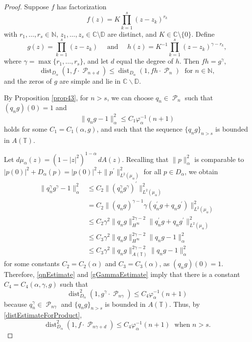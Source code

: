 \documentclass[11 pt,reqno]{amsart}
\theoremstyle{definition}
\theoremstyle{remark}
\numberwithin{equation}{section} \numberwithin{figure}{section}
\newcommand{\CC}{{\mathbb C}}
\newcommand{\DD}{{\mathbb D}}
\newcommand{\TT}{{\mathbb T}}
\newcommand{\NN}{{\mathbb N}}
\DeclareMathOperator{\Pol}{{\mathcal P}}
\DeclareMathOperator{\dist}{dist}
\begin{document}
\begin{proof}
Suppose $f$ has factorization
\[  f(z)=K \prod_{k=1}^s (z-z_k)^{r_k}  \]
with $r_{1},\ldots,r_{s}\in\NN$, $z_1,\ldots,z_{s}\in\CC\setminus\DD$ are distinct,
and $K \in\CC\setminus\{0\}$.  Define
\[g(z)=\prod_{k=1}^{s}(z-z_k)\quad\text{ and }\quad
    h(z) =K^{-1}\prod_{k=1}^s (z-z_k)^{\gamma- r_k},\]
where $\gamma=\max\{r_1,\ldots,r_s\}$, and let $d$ equal the degree of $h$.
Then $fh=g^{\gamma}$,
\begin{equation}\label{distEstimateForProduct}
            \dist_{D_{\alpha}}(1,f\cdot\Pol_{n+d})
            \leq\dist_{D_{\alpha}}(1,fh\cdot\Pol_{n})\;\text{ for }n\in\NN,
\end{equation}
and the zeros of $g$ are simple and lie in $\CC\backslash\DD$.

By Proposition \ref{prop43}, for $n>s$, we can choose $q_{n}\in\Pol_{n}$ such
that $(q_{n}g)(0)=1$ and
\begin{equation}\label{qnEstimate}
            \|q_{n}g-1\|^2_\alpha\leq C_{1}\varphi_{\alpha}^{-1}(n+1)
\end{equation}
holds for some $C_{1}=C_{1}(\alpha,g)$,  and such that the sequence
$\{q_{n} g\}_{n>s}$ is bounded in $A(\TT)$.

Let $d\mu_{\alpha}(z)=(1-|z|^{2})^{1-\alpha}\, dA(z)$.  Recalling that
$\|p\|_{\alpha}^2$ is comparable to
$|p(0)|^{2}+D_{\alpha}(p)=|p(0)|^{2}+\|p^{\prime}\|_{L^{2}(\mu_{\alpha})}^{2}$
for all $p\in D_{\alpha}$, we obtain
\begin{align}
            \|q_{n}^{\gamma}g^{\gamma} -1\|^2_\alpha
            &\leq C_{2}\|(q_{n}^{\gamma}g^{\gamma})^{\prime}\|^2_{L^{2}(\mu_{\alpha})}\nonumber\\
            &= C_{2}\|(q_n g)^{\gamma-1}\gamma (q_n^{\prime}g
            +q_n g^{\prime})\|^2_{L^{2}(\mu_{\alpha})}\nonumber\\
            &\leq C_{2}\gamma^{2}\|q_n g\|_{H^{\infty}}^{2\gamma-2}
            \|q_n^{\prime}g+q_n g^{\prime}\|^2_{L^{2}(\mu_{\alpha})}\nonumber\\
            &\leq C_{3}\gamma^{2}\|q_n g\|_{H^{\infty}}^{2\gamma-2}
            \|q_{n}g-1\|^{2}_{\alpha}\nonumber\\
            &\leq C_{3}\gamma^{2}\|q_n g\|_{A(\TT)}^{2\gamma-2}
            \|q_{n}g-1\|^{2}_{\alpha}\label{gGammaEstimate}
\end{align}
for some constants $C_{2}=C_{2}(\alpha)$ and $C_{3}=C_{3}(\alpha)$, as
$(q_{n}g)(0)=1$.  Therefore, \eqref{qnEstimate} and \eqref{gGammaEstimate}
imply that there is a constant $C_{4}=C_{4}(\alpha,\gamma, g)$ such that
\[  \dist_{D_{\alpha}}^{2}(1,g^{\gamma}\cdot\Pol_{n\gamma})
        \leq C_{4}\varphi_{\alpha}^{-1}(n+1)    \]
because $q_{n}^{\gamma}\in\Pol_{n\gamma}$ and $\{q_{n} g\}_{n>s}$ is bounded
in $A(\TT)$.  Thus, by \eqref{distEstimateForProduct},
\begin{equation}\label{distLinear}
            \dist_{D_{\alpha}}^{2}(1,f\cdot\Pol_{n\gamma+d})
            \leq C_{4}\varphi_{\alpha}^{-1}(n+1)\;\text{ when }n>s.
\end{equation}


\end{proof}
\end{document}

